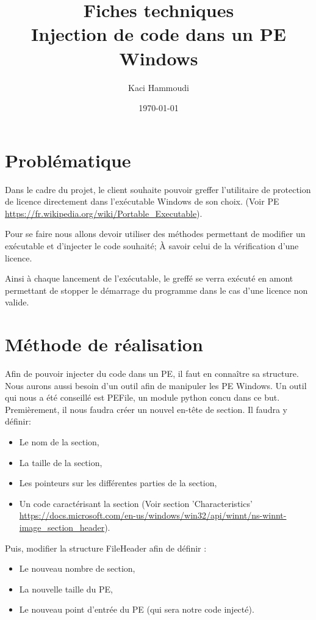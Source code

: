 \documentclass{article}
\title{
    \Huge
    Fiches techniques\\
    Injection de code dans un PE Windows
}
\author{\huge Kaci Hammoudi}
\date{\huge \today}
\begin{document}
\maketitle
\newpage

\section{Problématique}

Dans le cadre du projet, le client souhaite pouvoir greffer l'utilitaire de protection de licence directement dans l'exécutable Windows de son choix. 
(Voir PE \url{https://fr.wikipedia.org/wiki/Portable_Executable}).

Pour se faire nous allons devoir utiliser des méthodes permettant de modifier un exécutable
et d'injecter le code souhaité; À savoir celui de la vérification d'une licence.

Ainsi à chaque lancement de l'exécutable, le greffé se verra exécuté en amont permettant 
de stopper le démarrage du programme dans le cas d'une licence non valide.

\section{Méthode de réalisation}

Afin de pouvoir injecter du code dans un PE, il faut en connaître sa structure. 
Nous aurons aussi besoin d'un outil afin de manipuler les PE Windows.
Un outil qui nous a été conseillé est PEFile, un module python concu dans ce but.\\

Premièrement, il nous faudra créer un nouvel en-tête de section.
Il faudra y définir: 
\begin{itemize}
    \item Le nom de la section,
    \item La taille de la section,
    \item Les pointeurs sur les différentes parties de la section,
    \item Un code caractérisant la section (Voir section 'Characteristics' \url{https://docs.microsoft.com/en-us/windows/win32/api/winnt/ns-winnt-image_section_header}).
\end{itemize}

Puis, modifier la structure FileHeader afin de définir :
\begin{itemize}
    \item Le nouveau nombre de section,
    \item La nouvelle taille du PE,
    \item Le nouveau point d'entrée du PE (qui sera notre code injecté).
\end{itemize}
\end{document}
